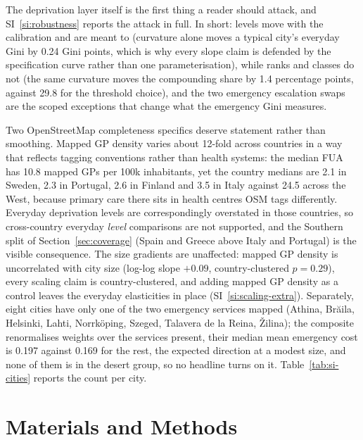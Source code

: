 \documentclass[11pt]{article}
\begin{document}
The deprivation layer itself is the first thing a reader should attack,
and SI~\ref{si:robustness} reports the attack in full. In short: levels
move with the calibration and are meant to (curvature alone moves a
typical city's everyday Gini by 0.24 Gini points, which is why every slope
claim is defended by the specification curve rather than one
parameterisation), while ranks and classes do not (the same curvature
moves the compounding share by 1.4 percentage points, against 29.8 for the
threshold choice), and the two emergency escalation swaps are the scoped
exceptions that change what the emergency Gini measures.

Two OpenStreetMap completeness specifics deserve statement rather than
smoothing. Mapped GP density varies about 12-fold across countries in a
way that reflects tagging conventions rather than health systems: the
median FUA has 10.8 mapped GPs per 100k inhabitants, yet the country
medians are 2.1 in Sweden, 2.3 in Portugal, 2.6 in Finland and 3.5 in
Italy against 24.5 across the West, because primary care there sits in
health centres OSM tags differently. Everyday deprivation levels are
correspondingly overstated in those countries, so cross-country everyday
\emph{level} comparisons are not supported, and the Southern split of
Section~\ref{sec:coverage} (Spain and Greece above Italy and Portugal) is
the visible consequence. The size gradients are unaffected: mapped GP
density is uncorrelated with city size (log-log slope $+0.09$,
country-clustered $p = 0.29$), every scaling claim is country-clustered,
and adding mapped GP density as a control leaves the everyday elasticities
in place (SI~\ref{si:scaling-extra}). Separately, eight cities have only one of the two
emergency services mapped (Athina, Br\u{a}ila, Helsinki, Lahti,
Norrk\"oping, Szeged, Talavera de la Reina, \v{Z}ilina); the composite
renormalises weights over the services present, their median mean
emergency cost is 0.197 against 0.169 for the rest, the expected direction
at a modest size, and none of them is in the desert group, so no headline
turns on it. Table~\ref{tab:si-cities} reports the count per city.

\section{Materials and Methods}\label{sec:methods}
\end{document}
